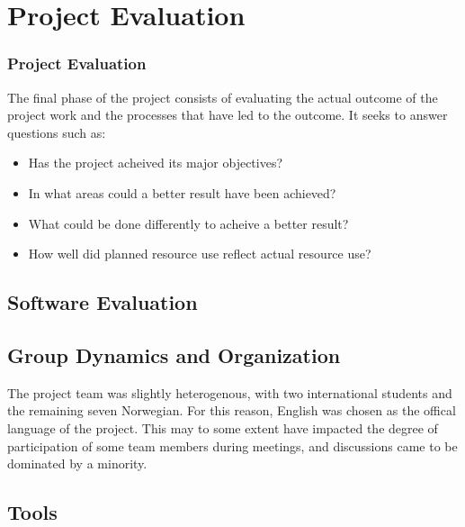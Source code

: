  

\chapter{Project Evaluation}\label{eval}

\minitoc

\subsection*{Project Evaluation}
The final phase of the project consists of evaluating the actual outcome of
the project work and the processes that have led to the outcome. It
seeks to answer questions such as:

\begin{itemize}
\item Has the project acheived its major objectives?
\item In what areas could a better result have been achieved?
\item What could be done differently to acheive a better result?
\item How well did planned resource use reflect actual resource use?
\end{itemize}

\section{Software Evaluation}




\section{Group Dynamics and Organization}
The project team was slightly heterogenous, with two international
students and the remaining seven Norwegian. For this reason, English
was chosen as the offical language of the project. This may to some
extent have impacted the degree of participation of some team members
during meetings, and discussions came to be dominated by a minority. 



\section{Tools}

